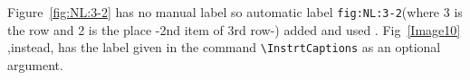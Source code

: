 \documentclass{article}
\begin{document}



Figure~\ref{fig:NL:3-2} has no manual label so automatic label \verb|fig:NL:3-2|(where 3 is the row and 2 is the place -2nd item of 3rd row-) added and used . Fig~\ref{Image10} ,instead, has the label given in the command \verb|\InstrtCaptions| as an optional argument.
\end{document}

